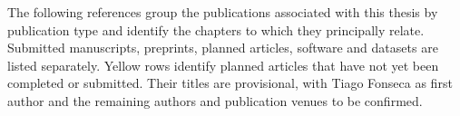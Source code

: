 \label{sec:thesis-publications}

The following references group the publications associated with this thesis by publication type and identify the chapters to which they principally relate. Submitted manuscripts, preprints, planned articles, software and datasets are listed separately. Yellow rows identify planned articles that have not yet been completed or submitted. Their titles are provisional, with Tiago Fonseca as first author and the remaining authors and publication venues to be confirmed.

\begingroup\small
\hypersetup{allcolors=black}
\newcommand{\publicationlink}[2]{\href{#1}{\underline{#2}}}
\setlength{\LTpre}{0.5\baselineskip}
